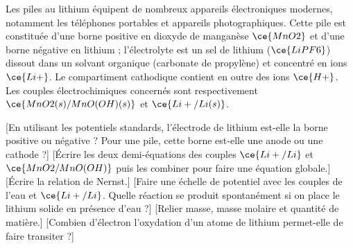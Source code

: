     Les piles au lithium équipent de nombreux appareils électroniques modernes, notamment les téléphones portables et appareils photographiques. Cette pile est constituée d’une borne positive en dioxyde de manganèse $\ce{MnO2}$ et d’une borne négative en lithium ; l’électrolyte est un sel de lithium ($\ce{LiPF6}$) dissout dans un solvant organique (carbonate de propylène) et concentré en ions $\ce{Li+}$. Le compartiment cathodique contient en outre des ions $\ce{H+}$. Les couples électrochimiques concernés sont respectivement $\ce{MnO2(s)/MnO(OH)(s)}$ et $\ce{Li+ /Li(s)}$.
    \begin{enumerate}
        [En utilisant les potentiels standards, l'électrode de lithium est-elle la borne positive ou négative ? Pour une pile, cette borne est-elle une anode ou une cathode ?]
        [Écrire les deux demi-équations des couples $\ce{Li+ / Li}$ et $\ce{MnO2 / MnO(OH)}$ puis les combiner pour faire une équation globale.]
        [Écrire la relation de Nernst.]
        [Faire une échelle de potentiel avec les couples de l'eau et $\ce{Li+ / Li}$. Quelle réaction se produit spontanément si on place le lithium solide en présence d'eau ?]
        [Relier masse, masse molaire et quantité de matière.]
        [Combien d'électron l'oxydation d'un atome de lithium permet-elle de faire transiter ?]
    \end{enumerate}

